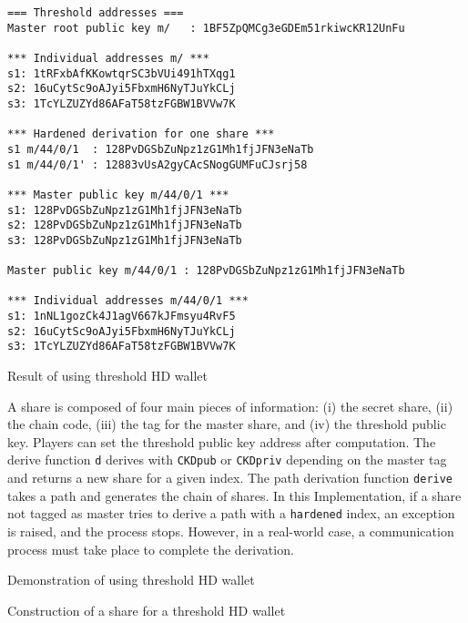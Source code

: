 \begin{listing}
  \begin{verbatim}
=== Threshold addresses ===
Master root public key m/   : 1BF5ZpQMCg3eGDEm51rkiwcKR12UnFu

*** Individual addresses m/ ***
s1: 1tRFxbAfKKowtqrSC3bVUi491hTXqg1
s2: 16uCytSc9oAJyi5FbxmH6NyTJuYkCLj
s3: 1TcYLZUZYd86AFaT58tzFGBW1BVVw7K

*** Hardened derivation for one share ***
s1 m/44/0/1  : 128PvDGSbZuNpz1zG1Mh1fjJFN3eNaTb
s1 m/44/0/1' : 12883vUsA2gyCAcSNogGUMFuCJsrj58

*** Master public key m/44/0/1 ***
s1: 128PvDGSbZuNpz1zG1Mh1fjJFN3eNaTb
s2: 128PvDGSbZuNpz1zG1Mh1fjJFN3eNaTb
s3: 128PvDGSbZuNpz1zG1Mh1fjJFN3eNaTb

Master public key m/44/0/1 : 128PvDGSbZuNpz1zG1Mh1fjJFN3eNaTb

*** Individual addresses m/44/0/1 ***
s1: 1nNL1gozCk4J1agV667kJFmsyu4RvF5
s2: 16uCytSc9oAJyi5FbxmH6NyTJuYkCLj
s3: 1TcYLZUZYd86AFaT58tzFGBW1BVVw7K
  \end{verbatim}
	\caption{Result of using threshold HD wallet}
	\label{lst:testThresholdHDMainRes}
\end{listing}

A share is composed of four main pieces of information: (i) the secret share, (ii) the
chain code, (iii) the tag for the master share, and (iv) the threshold public
key. Players can set the threshold public key address after computation. The
derive function \texttt{d} derives with \texttt{CKDpub} or \texttt{CKDpriv}
depending on the master tag and returns a new share for a given index. The path
derivation function \texttt{derive} takes a path and generates the chain of
shares. In this Implementation, if a share not tagged as master tries to derive a
path with a \texttt{hardened} index, an exception is raised, and the process
stops. However, in a real-world case, a communication process must take place to
complete the derivation.

\begin{listing}
	\caption{Demonstration of using threshold HD wallet}
	\label{lst:testThresholdHDMain}
\end{listing}

\begin{listing}
	\caption{Construction of a share for a threshold HD wallet}
	\label{lst:testThresholdHDShare}
\end{listing}


